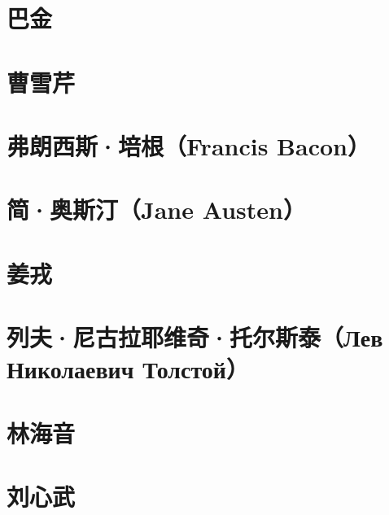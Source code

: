 \documentclass[12pt,utf8]{book}
\begin{document}
\chapter{巴金}

% 


\chapter{曹雪芹}


\clearpage

\chapter{弗朗西斯·培根（Francis Bacon）}


% 


\chapter{简·奥斯汀（Jane Austen）}

% 


\chapter{姜戎}


% 


\chapter{列夫·尼古拉耶维奇·托尔斯泰（Лев Николаевич Толстой）}


\clearpage

% 

\chapter{林海音}

% 

\chapter{刘心武}

% 
\end{document}
